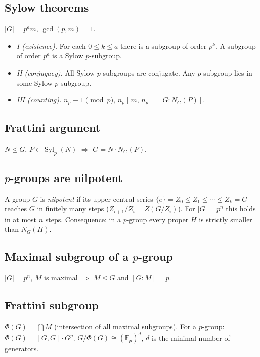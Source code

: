 \subsection{Sylow theorems}
\label{subsec:sylow}

$|G|=p^a m$, $\gcd(p,m)=1$.
\begin{itemize}
\item \textit{I (existence).} For each $0\le k\le a$ there is a subgroup of order $p^k$. A subgroup of order $p^a$ is a Sylow $p$-subgroup.
\item \textit{II (conjugacy).} All Sylow $p$-subgroups are conjugate. Any $p$-subgroup lies in some Sylow $p$-subgroup.
\item \textit{III (counting).} $n_p\equiv1\pmod p$, $n_p\mid m$, $n_p=[G:N_G(P)]$.
\end{itemize}

\subsection{Frattini argument}
\label{subsec:frattini}

$N\trianglelefteq G$, $P\in\operatorname{Syl}_p(N)$ $\Rightarrow$ $G=N\cdot N_G(P)$.

\subsection{$p$-groups are nilpotent}
\label{subsec:pgroup-nilpotent}

A group $G$ is \textit{nilpotent} if its upper central series $\{e\}=Z_0\le Z_1\le\cdots\le Z_k=G$ reaches $G$ in finitely many steps ($Z_{i+1}/Z_i=Z(G/Z_i)$). For $|G|=p^n$ this holds in at most $n$ steps. Consequence: in a $p$-group every proper $H$ is strictly smaller than $N_G(H)$.

\subsection{Maximal subgroup of a $p$-group}
\label{subsec:pgroup-maximal}

$|G|=p^n$, $M$ is maximal $\Rightarrow$ $M\trianglelefteq G$ and $[G:M]=p$.

\subsection{Frattini subgroup}
\label{subsec:frattini-subgroup}

$\Phi(G)=\bigcap M$ (intersection of all maximal subgroups). For a $p$-group: $\Phi(G)=[G,G]\cdot G^p$.
$G/\Phi(G)\cong(\mathbb{F}_p)^d$, $d$ is the minimal number of generators.

